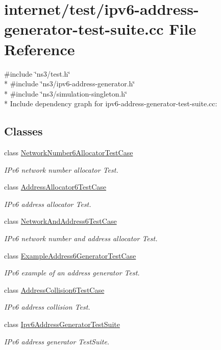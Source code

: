 \hypertarget{ipv6-address-generator-test-suite_8cc}{}\section{internet/test/ipv6-\/address-\/generator-\/test-\/suite.cc File Reference}
\label{ipv6-address-generator-test-suite_8cc}
{\ttfamily \#include \char`\"{}ns3/test.\+h\char`\"{}}\\*
{\ttfamily \#include \char`\"{}ns3/ipv6-\/address-\/generator.\+h\char`\"{}}\\*
{\ttfamily \#include \char`\"{}ns3/simulation-\/singleton.\+h\char`\"{}}\\*
Include dependency graph for ipv6-\/address-\/generator-\/test-\/suite.cc\+:
\subsection*{Classes}
\begin{DoxyCompactItemize}
\item 
class \hyperlink{classNetworkNumber6AllocatorTestCase}{Network\+Number6\+Allocator\+Test\+Case}
\begin{DoxyCompactList}\small\item\em I\+Pv6 network number allocator Test. \end{DoxyCompactList}\item 
class \hyperlink{classAddressAllocator6TestCase}{Address\+Allocator6\+Test\+Case}
\begin{DoxyCompactList}\small\item\em I\+Pv6 address allocator Test. \end{DoxyCompactList}\item 
class \hyperlink{classNetworkAndAddress6TestCase}{Network\+And\+Address6\+Test\+Case}
\begin{DoxyCompactList}\small\item\em I\+Pv6 network number and address allocator Test. \end{DoxyCompactList}\item 
class \hyperlink{classExampleAddress6GeneratorTestCase}{Example\+Address6\+Generator\+Test\+Case}
\begin{DoxyCompactList}\small\item\em I\+Pv6 example of an address generator Test. \end{DoxyCompactList}\item 
class \hyperlink{classAddressCollision6TestCase}{Address\+Collision6\+Test\+Case}
\begin{DoxyCompactList}\small\item\em I\+Pv6 address collision Test. \end{DoxyCompactList}\item 
class \hyperlink{classIpv6AddressGeneratorTestSuite}{Ipv6\+Address\+Generator\+Test\+Suite}
\begin{DoxyCompactList}\small\item\em I\+Pv6 address generator Test\+Suite. \end{DoxyCompactList}\end{DoxyCompactItemize}
